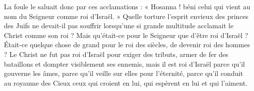  La foule le saluait donc par ces acclamations : « Hosanna ! béni celui qui vient au nom du Seigneur comme roi d’Israël. » Quelle torture l’esprit envieux des princes des Juifs ne devait-il pas souffrir lorsqu’une si grande multitude acclamait le Christ comme son roi ? Mais qu’était-ce pour le Seigneur que d’être roi d’Israël ? Était-ce quelque chose de grand pour le roi des siècles, de devenir roi des hommes ? Le Christ ne fut pas roi d’Israël pour exiger des tributs, armer de fer des bataillons et dompter visiblement ses ennemis, mais il est roi d’Israël parce qu’il gouverne les âmes, parce qu’il veille sur elles pour l’éternité, parce qu’il conduit au royaume des Cieux ceux qui croient en lui, qui espèrent en lui et qui l’aiment.
